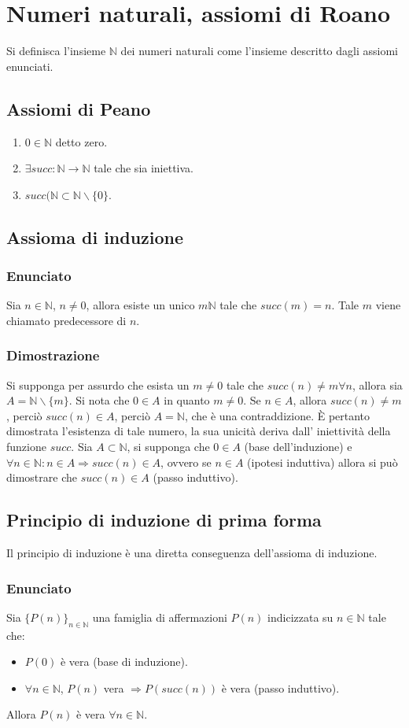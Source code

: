 \chapter{Numeri naturali, assiomi di Roano}
Si definisca l'insieme $\mathbb{N}$ dei numeri naturali come l'insieme descritto dagli assiomi enunciati.
\section{Assiomi di Peano}
\begin{enumerate}
\item $0\in\mathbb{N}$ detto zero.
\item $\exists succ:\mathbb{N}\rightarrow\mathbb{N}$ tale che sia iniettiva.
\item $succ(\mathbb{N}\subset\mathbb{N}\backslash\{0\}$.
\end{enumerate}
\section{Assioma di induzione}
\subsection{Enunciato}
Sia $n\in\mathbb{N}$, $n\neq 0$, allora esiste un unico $m\mathbb{N}$ tale che $succ(m)=n$. Tale $m$ viene chiamato predecessore di $n$.
\subsection{Dimostrazione}
Si supponga per assurdo che esista un $m\neq 0$ tale che $succ(n)\neq m\forall n$, allora sia $A=\mathbb{N}\backslash\{m\}$. Si nota che $0\in A$ in quanto $m\neq 0$. Se $n\in A$, allora
$succ(n)\neq m$, perci\`o $succ(n)\in A$, perci\`o $A=\mathbb{N}$, che \`e una contraddizione. \`E pertanto dimostrata l'esistenza di tale numero, la sua unicit\`a deriva dall'
iniettivit\`a della funzione $succ$.
Sia $A\subset\mathbb{N}$, si supponga che $0\in A$ (base dell'induzione) e $\forall  n\in\mathbb{N}:n\in A\Rightarrow succ(n)\in A$, ovvero se $n\in A$ (ipotesi induttiva) allora 
si pu\`o dimostrare che $succ(n)\in A$ (passo induttivo).
\section{Principio di induzione di prima forma}
Il principio di induzione \`e una diretta conseguenza dell'assioma di induzione.
\subsection{Enunciato}
Sia $\{P(n)\}_{n\in\mathbb{N}}$ una famiglia di affermazioni $P(n)$ indicizzata su $n\in\mathbb{N}$ tale che:
\begin{itemize}
\item $P(0)$ \`e vera (base di induzione).
\item $\forall n\in\mathbb{N}$, $P(n)$ vera $\Rightarrow P(succ(n))$ \`e vera (passo induttivo).
\end{itemize}
Allora $P(n)$ \`e vera $\forall n\in\mathbb{N}$.
